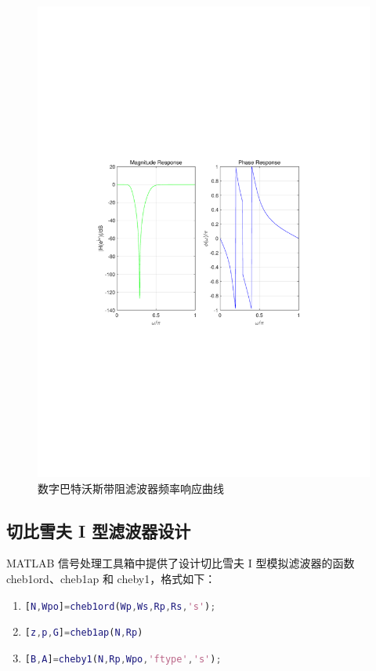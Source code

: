 \documentclass[12pt,AutoFakeBold]{article}
\begin{document}
\begin{figure}[hbtp]
	\centering
	\includegraphics[width=14cm]{figure/BSBF.pdf}
	\caption{数字巴特沃斯带阻滤波器频率响应曲线} \label{fig:BSBF}
\end{figure}

\subsection{切比雪夫 I 型滤波器设计}

MATLAB 信号处理工具箱中提供了设计切比雪夫 I 型模拟滤波器的函数 cheb1ord、cheb1ap 和 cheby1，格式如下：

\begin{enumerate}[(1)]
\item \lstinline[language=Matlab]|[N,Wpo]=cheb1ord(Wp,Ws,Rp,Rs,'s');|
\item \lstinline[language=Matlab]|[z,p,G]=cheb1ap(N,Rp)|
\item \lstinline[language=Matlab]|[B,A]=cheby1(N,Rp,Wpo,'ftype','s');|
\end{enumerate}
\end{document}
